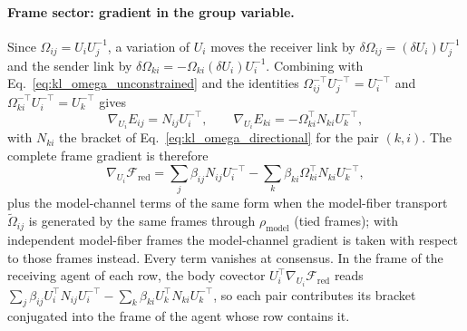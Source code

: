 \paragraph{Frame sector: gradient in the group variable.}
Since $\Omega_{ij} = U_iU_j^{-1}$, a variation of $U_i$ moves the receiver link by $\delta\Omega_{ij} = (\delta U_i)U_j^{-1}$ and the sender link by $\delta\Omega_{ki} = -\Omega_{ki}(\delta U_i)U_i^{-1}$. Combining with Eq.~\eqref{eq:kl_omega_unconstrained} and the identities $\Omega_{ij}^{-\top}U_j^{-\top} = U_i^{-\top}$ and $\Omega_{ki}^{-\top}U_i^{-\top} = U_k^{-\top}$ gives
\begin{equation}
\nabla_{U_i}E_{ij} = N_{ij}U_i^{-\top},
\qquad
\nabla_{U_i}E_{ki} = -\Omega_{ki}^{\top}N_{ki}U_k^{-\top},
\end{equation}
with $N_{ki}$ the bracket of Eq.~\eqref{eq:kl_omega_directional} for the pair $(k, i)$. The complete frame gradient is therefore
\begin{equation}
\nabla_{U_i}\mathcal{F}_{\mathrm{red}} = \sum_j \beta_{ij}N_{ij}U_i^{-\top} - \sum_k \beta_{ki}\Omega_{ki}^{\top}N_{ki}U_k^{-\top},
\label{eq:canonical_gradient_frame}
\end{equation}
plus the model-channel terms of the same form when the model-fiber transport $\tilde\Omega_{ij}$ is generated by the same frames through $\rho_{\mathrm{model}}$ (tied frames); with independent model-fiber frames the model-channel gradient is taken with respect to those frames instead. Every term vanishes at consensus. In the frame of the receiving agent of each row, the body covector $U_i^\top\nabla_{U_i}\mathcal{F}_{\mathrm{red}}$ reads $\sum_j\beta_{ij}U_i^\top N_{ij}U_i^{-\top} - \sum_k\beta_{ki}U_k^\top N_{ki}U_k^{-\top}$, so each pair contributes its bracket conjugated into the frame of the agent whose row contains it.


